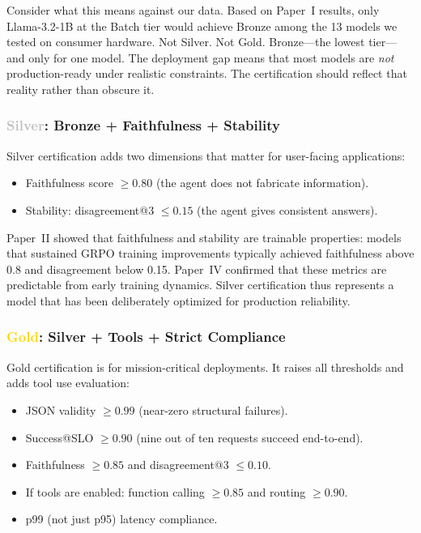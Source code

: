 \documentclass[11pt]{article}
\begin{document}
Consider what this means against our data. Based on Paper~I results, only Llama-3.2-1B at the Batch tier would achieve Bronze among the 13 models we tested on consumer hardware. Not Silver. Not Gold. Bronze---the lowest tier---and only for one model. The deployment gap means that most models are \emph{not} production-ready under realistic constraints. The certification should reflect that reality rather than obscure it.

\subsubsection{\textcolor{silver}{Silver}: Bronze + Faithfulness + Stability}

Silver certification adds two dimensions that matter for user-facing applications:
\begin{itemize}[leftmargin=12pt]
  \item Faithfulness score $\geq 0.80$ (the agent does not fabricate information).
  \item Stability: disagreement@3 $\leq 0.15$ (the agent gives consistent answers).
\end{itemize}

Paper~II showed that faithfulness and stability are trainable properties: models that sustained GRPO training improvements typically achieved faithfulness above 0.8 and disagreement below 0.15. Paper~IV confirmed that these metrics are predictable from early training dynamics. Silver certification thus represents a model that has been deliberately optimized for production reliability.

\subsubsection{\textcolor{gold}{Gold}: Silver + Tools + Strict Compliance}

Gold certification is for mission-critical deployments. It raises all thresholds and adds tool use evaluation:
\begin{itemize}[leftmargin=12pt]
  \item JSON validity $\geq 0.99$ (near-zero structural failures).
  \item Success@SLO $\geq 0.90$ (nine out of ten requests succeed end-to-end).
  \item Faithfulness $\geq 0.85$ and disagreement@3 $\leq 0.10$.
  \item If tools are enabled: function calling $\geq 0.85$ and routing $\geq 0.90$.
  \item p99 (not just p95) latency compliance.
\end{itemize}
\end{document}
